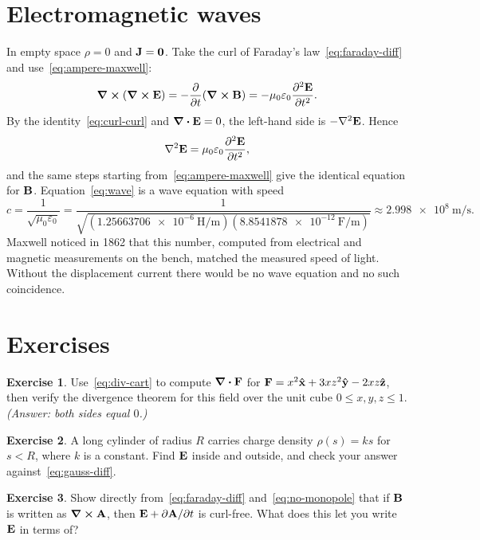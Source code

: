 \documentclass[11pt,a4paper]{article}
\theoremstyle{definition}
\newtheorem{exercise}{Exercise}
\theoremstyle{remark}
\newcommand{\E}{\vb{E}}
\newcommand{\B}{\vb{B}}
\newcommand{\J}{\vb{J}}
\newcommand{\eps}{\varepsilon_0}
\begin{document}
\section{Electromagnetic waves}
\label{sec:waves}

In empty space $\rho = 0$ and $\J = \vb{0}$. Take the curl of Faraday's law~\eqref{eq:faraday-diff} and use~\eqref{eq:ampere-maxwell}:
\[
  \curl(\curl{\E}) = -\pdv{t}(\curl{\B}) = -\mu_0\eps\pdv[2]{\E}{t}.
\]
By the identity~\eqref{eq:curl-curl} and $\div{\E} = 0$, the left-hand side is $-\laplacian{\E}$. Hence
\begin{equation}\label{eq:wave}
  \laplacian{\E} = \mu_0\eps\pdv[2]{\E}{t},
\end{equation}
and the same steps starting from~\eqref{eq:ampere-maxwell} give the identical equation for $\B$. Equation~\eqref{eq:wave} is a wave equation with speed
\begin{equation}\label{eq:c}
  c = \frac{1}{\sqrt{\mu_0\eps}}
    = \frac{1}{\sqrt{(\SI{1.25663706e-6}{\henry\per\metre})(\SI{8.8541878e-12}{\farad\per\metre})}}
    \approx \SI{2.998e8}{\metre\per\second}.
\end{equation}
Maxwell noticed in 1862 that this number, computed from electrical and magnetic measurements on the bench, matched the measured speed of light. Without the displacement current there would be no wave equation and no such coincidence.

\section*{Exercises}

\begin{exercise}
Use~\eqref{eq:div-cart} to compute $\div{\vb{F}}$ for $\vb{F} = x^2\vu{x} + 3xz^2\vu{y} - 2xz\vu{z}$, then verify the divergence theorem for this field over the unit cube $0 \le x, y, z \le 1$. \emph{(Answer: both sides equal $0$.)}
\end{exercise}

\begin{exercise}
A long cylinder of radius $R$ carries charge density $\rho(s) = k s$ for $s < R$, where $k$ is a constant. Find $\E$ inside and outside, and check your answer against~\eqref{eq:gauss-diff}.
\end{exercise}

\begin{exercise}
Show directly from~\eqref{eq:faraday-diff} and~\eqref{eq:no-monopole} that if $\B$ is written as $\curl{\vb{A}}$, then $\E + \partial\vb{A}/\partial t$ is curl-free. What does this let you write $\E$ in terms of?
\end{exercise}
\end{document}
